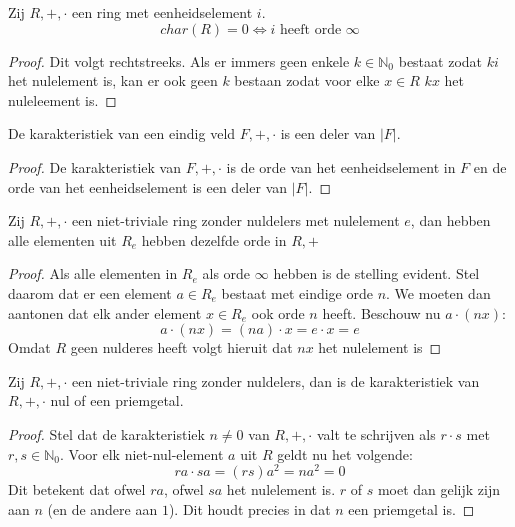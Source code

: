 \documentclass[main.tex]{subfiles}
\begin{document}
\begin{gev}
  Zij $R,+,\cdot$ een ring met eenheidselement $i$.
  \[ char(R) = 0 \Leftrightarrow i \text{ heeft orde } \infty \]

  \begin{proof}
    Dit volgt rechtstreeks.
    Als er immers geen enkele $k\in \mathbb{N}_{0}$ bestaat zodat $ki$ het nulelement is, kan er ook geen $k$ bestaan zodat voor elke $x\in R$ $kx$ het nuleleement is.
  \end{proof}
\end{gev}

\begin{gev}
  De karakteristiek van een eindig veld $F,+,\cdot$ is een deler van $|F|$.
  
  \begin{proof}
    De karakteristiek van $F,+,\cdot$ is de orde van het eenheidselement in $F$ en de orde van het eenheidselement is een deler van $|F|$.
  \end{proof}
\end{gev}

\begin{st}
  Zij $R,+,\cdot$ een niet-triviale ring zonder nuldelers met nulelement $e$, dan hebben alle elementen uit $R_{e}$ hebben dezelfde orde in $R,+$

  \begin{proof}
    Als alle elementen in $R_{e}$ als orde $\infty$ hebben is de stelling evident.
    Stel daarom dat er een element $a\in R_{e}$ bestaat met eindige orde $n$.
    We moeten dan aantonen dat elk ander element $x\in R_{e}$ ook orde $n$ heeft.
    Beschouw nu $a \cdot (nx)$:
    \[ a \cdot (nx) = (na) \cdot x = e \cdot x = e \]
    Omdat $R$ geen nulderes heeft volgt hieruit dat $nx$ het nulelement is
  \end{proof}
\end{st}

\begin{st}
 Zij $R,+,\cdot$ een niet-triviale ring zonder nuldelers, dan is de karakteristiek van $R,+,\cdot$ nul of een priemgetal.
 
 \begin{proof}
   Stel dat de karakteristiek $n\neq 0$ van $R,+,\cdot$ valt te schrijven als $r\cdot s$ met $r, s \in \mathbb{N}_{0}$.
   Voor elk niet-nul-element $a$ uit $R$ geldt nu het volgende:
   \[ ra \cdot sa = (rs)a^{2} = na^{2} = 0 \]
   Dit betekent dat ofwel $ra$, ofwel $sa$ het nulelement is.
   $r$ of $s$ moet dan gelijk zijn aan $n$ (en de andere aan $1$).
   Dit houdt precies in dat $n$ een priemgetal is.
 \end{proof}
\end{st}
\end{document}
